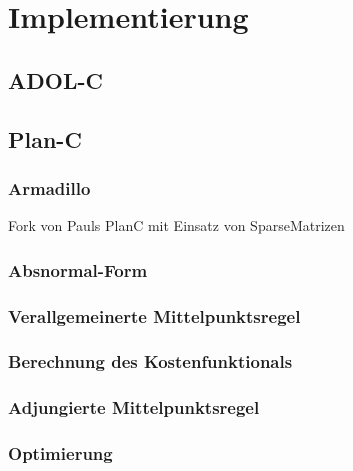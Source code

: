 \chapter{Implementierung}
\section{ADOL-C}

\section{Plan-C}
\subsection{Armadillo}
Fork von Pauls PlanC mit Einsatz von SparseMatrizen
\subsection{Absnormal-Form}

\subsection{Verallgemeinerte Mittelpunktsregel}

\subsection{Berechnung des Kostenfunktionals}

\subsection{Adjungierte Mittelpunktsregel}


\subsection{Optimierung}